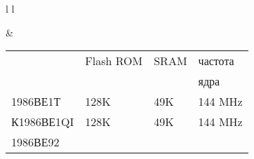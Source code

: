 \pagebreak
{}

\begin{tabular}{l l}

\mbox{}

&

\begin{tabular}{l l l l}
& Flash ROM & SRAM & частота \\
&&& ядра \\
\hline
1986ВЕ1Т & 128K & 49K & 144 MHz\\
К1986ВЕ1QI & 128K & 49K & 144 MHz\\
1986ВЕ92 & & \\
\end{tabular}

\\

\end{tabular}

